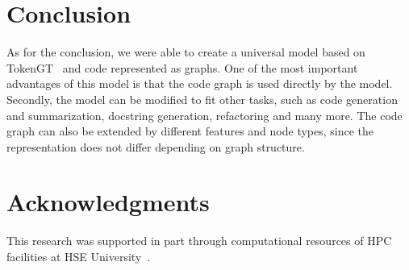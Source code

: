 \documentclass[sigplan,natbib=false]{acmart}
\begin{document}
\section{Conclusion}\label{sec:conclusion}

As for the conclusion, we were able to create a universal model based on TokenGT~\cite{kim_pure_2022} and code represented as graphs.
One of the most important advantages of this model is that the code graph is used directly by the model.
Secondly, the model can be modified to fit other tasks, such as code generation and summarization, docstring generation, refactoring and many more.
The code graph can also be extended by different features and node types, since the representation does not differ depending on graph structure.

\section{Acknowledgments}\label{sec:acknowledgments}

This research was supported in part through computational resources of HPC facilities at HSE University~\cite{kostenetskiy_hpc_2021}.

\printbibliography
\end{document}

